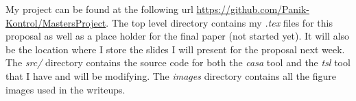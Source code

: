 \documentclass[a4full,12pt]{article}
\begin{document}
My project can be found at the following url \url{https://github.com/Panik-Kontrol/MastersProject}.
  The top level directory contains my \emph{.tex} files for this proposal as well as a place
  holder for the final paper (not started yet). It will also be the location where I store the
  slides I will present for the proposal next week. The \emph{src/} directory contains the source
  code for both the \emph{casa} tool and the \emph{tsl} tool that I have and will be modifying.
  The \emph{images} directory contains all the figure images used in the writeups.
\end{document}
